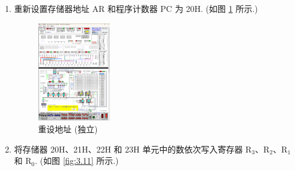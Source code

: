 \documentclass[../main.tex]{subfiles}
\begin{document}
\begin{enumerate}
    \item 重新设置存储器地址 AR 和程序计数器 PC 为 20H. (如图 \ref{fig:3.10} 所示.)

          \begin{figure}[htbp]
              \centering
              \includegraphics[width=0.3\textwidth]{screenshots/3.2.11.png}
              \caption{重设地址 (独立)}
              \label{fig:3.10}
          \end{figure}

    \item 将存储器 20H、21H、22H 和 23H 单元中的数依次写入寄存器 R$_3$、R$_2$、R$_1$ 和 R$_0$. (如图 \ref{fig:3.11} 所示.)


\end{enumerate}
\end{document}
